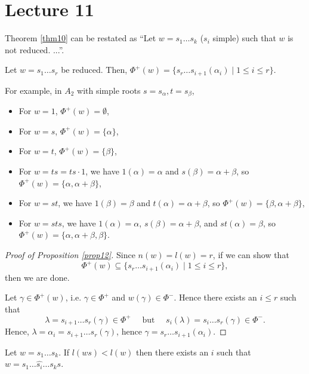 \section{Lecture 11}

Theorem \ref{thm10} can be restated as ``Let $w = s_1 \dots s_k$
($s_i$ simple) such that $w$ is not reduced. ...''.

\begin{proposition} \label{prop12}
Let $w = s_1 \dots s_r$ be reduced. Then, $\Phi^+(w) =
\{ s_r \dots s_{i+1} (\alpha_i) \mid 1 \leq i \leq r\}$.
\end{proposition}

For example, in $A_2$ with simple roots $s = s_\alpha, t = s_\beta$,
\begin{itemize}
\item For $w = 1$, $\Phi^+(w) = \emptyset$,
\item For $w = s$, $\Phi^+(w) = \{\alpha\}$,
\item For $w = t$, $\Phi^+(w) = \{\beta\}$,
\item For $w = ts = ts \cdot 1$, we have $1(\alpha) = \alpha$
and $s(\beta) = \alpha+\beta$, so
$\Phi^+(w) = \{\alpha, \alpha + \beta\}$,
\item For $w = st$, we have $1(\beta) = \beta$
and $t(\alpha) = \alpha+\beta$, so
$\Phi^+(w) = \{\beta, \alpha + \beta\}$,
\item For $w = sts$, we have $1(\alpha) = \alpha$,
$s(\beta) = \alpha+\beta$, and
$st(\alpha) = \beta$,
so $\Phi^+(w) = \{\alpha, \alpha + \beta, \beta\}$.
\end{itemize}

\begin{proof}[Proof of Proposition \ref{prop12}]
Since $n(w) = l(w) = r$, if we can show that
\[
\Phi^+(w) \subseteq \{ s_r \dots s_{i+1} (\alpha_i) \mid 1 \leq i \leq r\},
\]
then we are done.

Let $\gamma \in \Phi^+(w)$, i.e. $\gamma \in \Phi^+$ and $w(\gamma) \in \Phi^-$.
Hence there exists an $i \leq r$ such that
\[
    \lambda = s_{i+1} \dots s_r (\gamma) \in \Phi^+
\quad \text{ but } \quad
    s_i(\lambda) = s_{i} \dots s_r (\gamma) \in \Phi^-.
\]
Hence, $\lambda = \alpha_i = s_{i+1} \dots s_r (\gamma) $, hence
$\gamma = s_r \dots s_{i+1}(\alpha_i)$.
\end{proof}

\begin{theorem} \label{thm13}
Let $w = s_1 \dots s_k$. If $l(ws) < l(w)$ then there exists an $i$ such that
$w = s_1 \dots \hat{s_i} \dots s_k s$.
\end{theorem}

